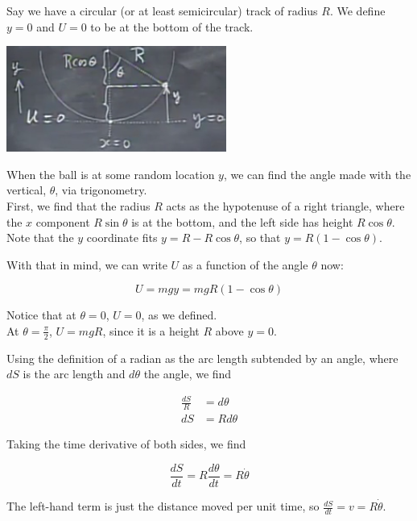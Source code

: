 \documentclass[8.01x]{subfiles}
\begin{document}
Say we have a circular (or at least semicircular) track of radius $R$. We define $y = 0$ and $U = 0$ to be at the bottom of the track.

\begin{center}
\includegraphics[scale=0.8]{Graphics/lec13_bowl}
\end{center}

When the ball is at some random location $y$, we can find the angle made with the vertical, $\theta$, via trigonometry.\\
First, we find that the radius $R$ acts as the hypotenuse of a right triangle, where the $x$ component $R \sin \theta$ is at the bottom, and the left side has height $R \cos \theta$. Note that the $y$ coordinate fits $y = R - R\cos \theta$, so that $y = R (1 - \cos \theta)$.

With that in mind, we can write $U$ as a function of the angle $\theta$ now:

\begin{equation}
U = m g y = m g R (1 - \cos \theta)
\end{equation}

Notice that at $\theta = 0$, $U = 0$, as we defined.\\
At $\displaystyle \theta = \frac{\pi}{2}$, $U = m g R$, since it is a height $R$ above $y = 0$.

Using the definition of a radian as the arc length subtended by an angle, where $dS$ is the arc length and $d\theta$ the angle, we find

\begin{align}
\frac{dS}{R} &= d\theta\\
dS &= R d\theta
\end{align}

Taking the time derivative of both sides, we find

\begin{equation}
\frac{dS}{dt} = R \frac{d\theta}{dt} = R \dot{\theta}
\end{equation}

The left-hand term is just the distance moved per unit time, so $\displaystyle \frac{dS}{dt} = v = R \dot{\theta}$.
\end{document}
